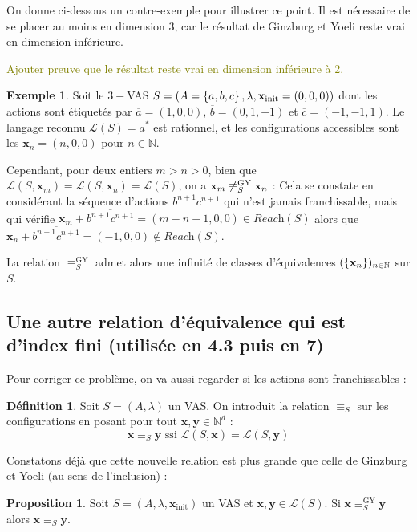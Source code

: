 \documentclass[a4paper,final]{article}
\theoremstyle{definition}
\newtheorem{Definition}[Theorem]{Définition}
\newtheorem{Proposition}[Theorem]{Proposition}
\newtheorem{Example}[Theorem]{Exemple}
\newcommand{\lucas}[1]{\textcolor{olive}{#1}}
\newcommand{\os}[1]{\left\{\mathinner{#1}\right\}}
\newcommand{\N}{\ensuremath{\mathbb{N}}}
\newcommand{\lang}{\ensuremath{\mathcal{L}}}
\newcommand{\reach}{\ensuremath{\textit{Reach}}}
\newcommand{\vect}[1]{\ensuremath{\mathbf{#1}}}
\newcommand{\rel}{\ensuremath{\equiv}}
\newcommand{\relGY}{\ensuremath{\equiv^\text{GY}_S}}
\newcommand{\ssi}{\ensuremath{\text{ ssi }}}
\newcommand{\xinit}{\ensuremath{\vect{x}_\text{init}}}
\newcommand{\valeur}[1]{\ensuremath{\overline{#1}}}
\begin{document}
\vspace{5mm}

On donne ci-dessous un contre-exemple pour illustrer ce point.
Il est nécessaire de se placer au moins en dimension 3, car le résultat de Ginzburg et Yoeli reste vrai en dimension inférieure.

\lucas{Ajouter preuve que le résultat reste vrai en dimension inférieure à 2.}

\begin{Example}
Soit le $3-$VAS $S = (A=\os{a,b,c}, \lambda, \xinit=(0,0,0))$ dont les actions sont étiquetés par $\valeur{a}=(1,0,0)$, $\valeur{b}=(0,1,-1)$ et $\valeur{c}=(-1,-1,1)$.
Le langage reconnu $\lang(S)=a^\ast$ est rationnel, et les configurations accessibles sont les $\vect{x}_n=(n,0,0)$ pour $n\in\N$.

Cependant, pour deux entiers $m>n>0$, bien que $\lang(S,\vect{x}_m) =\lang(S,\vect{x}_n) =\lang(S)$, on a $\vect{x}_m \not\relGY \vect{x}_n$ :
Cela se constate en considérant la séquence d'actions $b^{n+1}c^{n+1}$ qui n'est jamais franchissable, mais qui vérifie $\vect{x}_m +\valeur{b^{n+1}c^{n+1}} = (m-n-1,0,0)\in \reach(S)$ alors que $\vect{x}_n +\valeur{b^{n+1}c^{n+1}} = (-1,0,0)\notin \reach(S)$.

La relation $\relGY$ admet alors une infinité de classes d'équivalences $(\os{\vect{x}_n})_{n\in\N}$ sur $S$.
\end{Example}


\subsection{Une autre relation d'équivalence qui est d'index fini (utilisée en 4.3 puis en 7)}
Pour corriger ce problème, on va aussi regarder si les actions sont franchissables :

\begin{Definition}
Soit $S=(A,\lambda)$ un VAS. On introduit la relation $\rel_S$ sur les configurations en posant pour tout $\vect{x},\vect{y} \in\N^d$ :
$$\vect{x} \rel_S \vect{y} \ssi \lang(S,\vect{x}) = \lang(S,\vect{y})$$
\end{Definition}


Constatons déjà que cette nouvelle relation est plus grande que celle de Ginzburg et Yoeli (au sens de l'inclusion) :

\begin{Proposition}
Soit $S=(A,\lambda,\xinit)$ un VAS et $\vect{x},\vect{y} \in\lang(S)$.
Si $\vect{x} \relGY \vect{y}$ alors $\vect{x} \rel_S \vect{y}$.
\end{Proposition}
\end{document}
